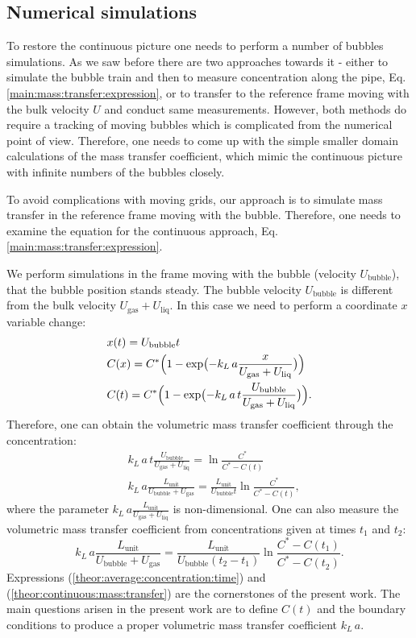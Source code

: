 \documentclass{article}
\newcommand{\beq}{\begin{equation}}
\newcommand{\feq}{\end{equation}}
\newcommand{\beqal}{\begin{equation}\begin{aligned}}
\newcommand{\feqal}{\end{aligned}\end{equation}}
\newcommand{\vol}{k_L\,a}
\newcommand{\lunit}{L_{\mathrm{unit}}}
\newcommand{\ububble}{U_{\mathrm{bubble}}}
\newcommand{\uliq}{U_{\mathrm{liq}}}
\newcommand{\ugas}{U_{\mathrm{gas}}}
\newcommand{\cstar}{C^{*}}
\newcommand{\volnondim}{\vol \frac{\lunit}{\ububble+\ugas}}
\begin{document}
\subsection{Numerical simulations}
\label{section:cases}
To restore the continuous picture one needs to perform a number of bubbles simulations. As we saw
before there are two approaches towards it - either to simulate
the bubble train and then to measure concentration along the pipe, Eq.
\ref{main:mass:transfer:expression}, or to transfer to the reference frame moving with the bulk
velocity $U$ and conduct same measurements. However, both methods do require a tracking of
moving bubbles which is complicated from the numerical point of view. Therefore, one needs to come
up with the simple smaller domain calculations of the mass transfer coefficient, which mimic the
continuous picture with infinite numbers of the bubbles closely. 

To avoid complications with moving grids, our
approach is to simulate mass transfer in the reference frame moving with the bubble. Therefore, one
needs to examine the equation for the continuous approach, Eq.
\ref{main:mass:transfer:expression}. 

We perform simulations in the frame moving with the bubble (velocity
$\ububble$), that the bubble position stands steady. The bubble velocity $\ububble$ is
different from the bulk velocity $\ugas+\uliq$. In this case we need to perform a coordinate $x$
variable change:
\beqal
\label{theor:average:concentration:time}
&x(t)=\ububble t\\
&C(x)=\cstar \Bigl(1-\exp\bigl(-\vol \frac{x}{\ugas+\uliq}\bigr)\Bigr)\\
&C(t)=\cstar \Bigl(1-\exp\bigl(-\vol\, t \frac{\ububble}{\ugas+\uliq}\bigr)\Bigr).
\feqal
Therefore, one can obtain the volumetric mass transfer coefficient through the concentration:
\beqal
\label{theor:one:concentration:time}
&\vol\, t \frac{\ububble}{\ugas+\uliq}=\ln \frac{\cstar}{\cstar-C(t)}\\
&\volnondim=\frac{\lunit}{\ububble t}\ln \frac{\cstar}{\cstar-C(t)},
\feqal
where the parameter $\vol \frac{\lunit}{\ugas+\uliq}$ is non-dimensional. One can also measure the
volumetric mass transfer coefficient from concentrations given at times $t_1$ and $t_2$:
\beq
\label{theor:continuous:mass:transfer}
\volnondim=\frac{\lunit}{\ububble
(t_2-t_1)}\ln\frac{C^{*}-C(t_1)}{C^{*}-C(t_2)}.
\feq
Expressions (\ref{theor:average:concentration:time}) and (\ref{theor:continuous:mass:transfer}) are
the cornerstones of the present work. The main questions arisen in the present work are to define
$C(t)$ and  the boundary conditions to produce a proper volumetric mass transfer coefficient
$\vol$. 
  
\end{document}
